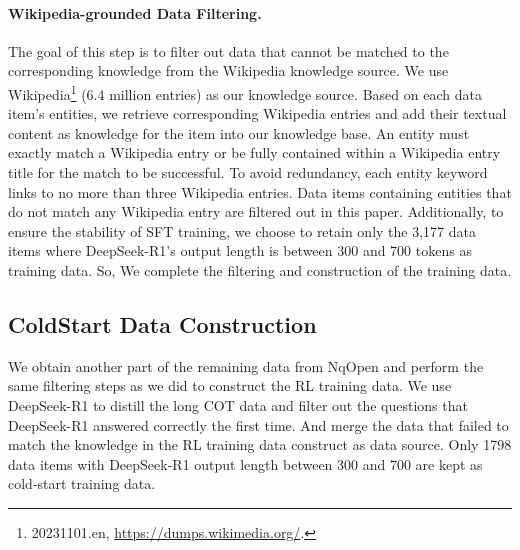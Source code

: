 \paragraph{Wikipedia-grounded Data Filtering.}
The goal of this step is to filter out data that cannot be matched to the corresponding knowledge from the Wikipedia knowledge source.
We use Wikipedia\footnote{20231101.en, \url{https://dumps.wikimedia.org/}.} (6.4 million entries) as our knowledge source. 
Based on each data item's entities, we retrieve corresponding Wikipedia entries and add their textual content as knowledge for the item into our knowledge base. An entity must exactly match a Wikipedia entry or be fully contained within a Wikipedia entry title for the match to be successful. 
To avoid redundancy, each entity keyword links to no more than three Wikipedia entries. 
Data items containing entities that do not match any Wikipedia entry are filtered out in this paper. 
Additionally, to ensure the stability of SFT training, we choose to retain only the 3,177 data items where DeepSeek-R1's output length is between 300 and 700 tokens as training data. 
So, We complete the filtering and construction of the training data.

\subsection{ColdStart Data Construction}
We obtain another part of the remaining data from NqOpen and perform the same filtering steps as we did to construct the RL training data.
We use DeepSeek-R1 to distill the long COT data and filter out the questions that DeepSeek-R1 answered correctly the first time. 
And merge the data that failed to match the knowledge in the RL training data construct as data source. 
Only 1798 data items with DeepSeek-R1 output length between 300 and 700 are kept as cold-start training data.




